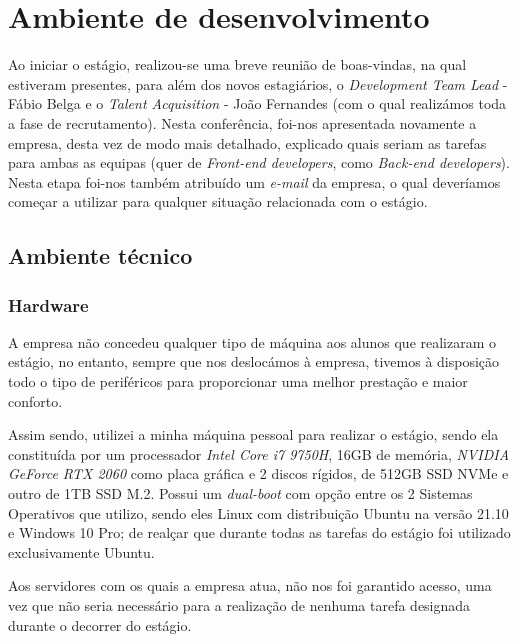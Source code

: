 \documentclass{article}
\begin{document}
\cleardoublepage
\section{Ambiente de desenvolvimento}
\label{sec:amb-dev}
\hspace*{0.5cm} Ao iniciar o estágio, realizou-se uma breve reunião de boas-vindas, na qual estiveram presentes, para além dos novos estagiários, o \emph{Development Team Lead} - Fábio Belga e o \emph{Talent Acquisition} - João Fernandes (com o qual realizámos toda a fase de recrutamento). Nesta conferência, foi-nos apresentada novamente a empresa, desta vez de modo mais detalhado, explicado quais seriam as tarefas para ambas as equipas (quer de \emph{Front-end developers}, como \emph{Back-end developers}). Nesta etapa foi-nos também atribuído um \emph{e-mail} da empresa, o qual deveríamos começar a utilizar para qualquer situação relacionada com o estágio. \newline

\subsection{Ambiente técnico}
\subsubsection{Hardware}
\hspace*{0.5cm} A empresa não concedeu qualquer tipo de máquina aos alunos que realizaram o estágio, no entanto, sempre que nos deslocámos à empresa, tivemos à disposição todo o tipo de periféricos para proporcionar uma melhor prestação e maior conforto. \newline

\hspace*{0.5cm} Assim sendo, utilizei a minha máquina pessoal para realizar o estágio, sendo ela constituída por um processador \emph{Intel Core i7 9750H}, 16GB de memória, \emph{NVIDIA GeForce RTX 2060} como placa gráfica e 2 discos rígidos, de 512GB SSD NVMe e outro de 1TB SSD M.2. Possui um \emph{dual-boot} com opção entre os 2 Sistemas Operativos que utilizo, sendo eles Linux com distribuição Ubuntu na versão 21.10 e Windows 10 Pro; de realçar que durante todas as tarefas do estágio foi utilizado exclusivamente Ubuntu. \newline

\hspace*{0.5cm} Aos servidores com os quais a empresa atua, não nos foi garantido acesso, uma vez que não seria necessário para a realização de nenhuma tarefa designada durante o decorrer do estágio. \newline
\end{document}
